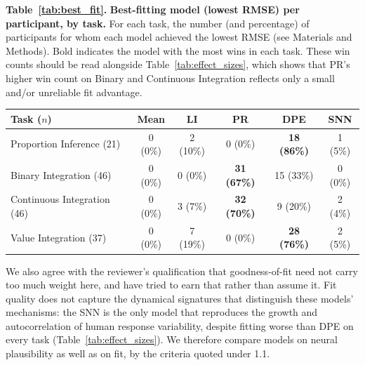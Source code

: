 \vspace{0.6em}
\noindent\begin{minipage}{\textwidth}\color{mscap}\scriptsize
{\textbf{Table~\ref{tab:best_fit}.} \textbf{Best-fitting model (lowest RMSE) per participant, by task.} For each task, the number (and percentage) of participants for whom each model achieved the lowest RMSE (see Materials and Methods). Bold indicates the model with the most wins in each task. These win counts should be read alongside Table~\ref{tab:effect_sizes}, which shows that PR's higher win count on Binary and Continuous Integration reflects only a small and/or unreliable fit advantage.\par}
\vspace{0.4em}
\begin{center}
\begin{tabular}{lccccc}
		\hline
		Task ($n$) & Mean & LI & PR & DPE & SNN \\
		\hline
		Proportion Inference (21) & 0 (0\%) & 2 (10\%) & 0 (0\%) & \textbf{18 (86\%)} & 1 (5\%) \\
		Binary Integration (46) & 0 (0\%) & 0 (0\%) & \textbf{31 (67\%)} & 15 (33\%) & 0 (0\%) \\
		Continuous Integration (46) & 0 (0\%) & 3 (7\%) & \textbf{32 (70\%)} & 9 (20\%) & 2 (4\%) \\
		Value Integration (37) & 0 (0\%) & 7 (19\%) & 0 (0\%) & \textbf{28 (76\%)} & 2 (5\%) \\
		\hline
	\end{tabular}
\end{center}
\end{minipage}
\vspace{0.8em}

We also agree with the reviewer's qualification that goodness-of-fit need not carry too much weight here, and have tried to earn that rather than assume it. Fit quality does not capture the dynamical signatures that distinguish these models' mechanisms: the SNN is the only model that reproduces the growth and autocorrelation of human response variability, despite fitting worse than DPE on every task (Table~\ref{tab:effect_sizes}). We therefore compare models on neural plausibility as well as on fit, by the criteria quoted under 1.1.



